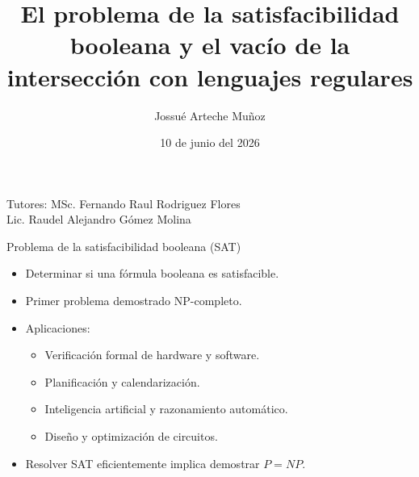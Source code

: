 \documentclass{beamer}
\title[SAT y la intersección con $\mathcal{L}(REG)$]
{El problema de la satisfacibilidad booleana y el vacío de la intersección con lenguajes regulares}
\author{Jossué Arteche Muñoz}
\institute[MATCOM]{Facultad de Matemática y Computación \\ Universidad de La Habana}
\date{10 de junio del 2026}
\newcommand{\tutores}{MSc. Fernando Raul Rodriguez Flores \\ Lic. Raudel Alejandro Gómez Molina}
\begin{document}

\begin{frame}
    \titlepage
    \vspace{1cm} %
    \begin{center}
        Tutores: \tutores \\ %
        \smallskip
    \end{center}
\end{frame}

\begin{frame}{Problema de la satisfacibilidad booleana (SAT)}
    \begin{itemize}
        \item Determinar si una fórmula booleana es satisfacible.

              \pause

        \item Primer problema demostrado NP-completo.

              \pause

        \item Aplicaciones:
              \begin{itemize}
                  \item Verificación formal de hardware y software.
                  \item Planificación y calendarización.
                  \item Inteligencia artificial y razonamiento automático.
                  \item Diseño y optimización de circuitos.
              \end{itemize}

              \pause

        \item Resolver SAT eficientemente implica demostrar $P = NP$.
    \end{itemize}
\end{frame}
\end{document}
